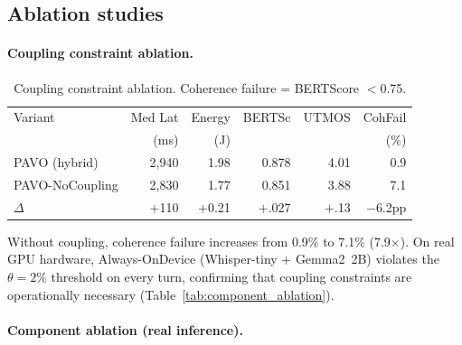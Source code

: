 \documentclass{article}
\begin{document}
\subsection{Ablation studies}

\paragraph{Coupling constraint ablation.}

\begin{table}[t]
\centering
\caption{Coupling constraint ablation. Coherence failure = BERTScore $<$0.75.}
\label{tab:ablation_coupling}
\small
\begin{tabular}{lrrrrr}
\toprule
Variant & Med Lat & Energy & BERTSc & UTMOS & CohFail \\
 & (ms) & (J) & & & (\%) \\
\midrule
PAVO (hybrid) & 2{,}940 & 1.98 & 0.878 & 4.01 & 0.9 \\
PAVO-NoCoupling & 2{,}830 & 1.77 & 0.851 & 3.88 & 7.1 \\
\midrule
$\Delta$ & $+$110 & $+$0.21 & $+$.027 & $+$.13 & $-$6.2pp \\
\bottomrule
\end{tabular}
\end{table}

Without coupling, coherence failure increases from 0.9\% to 7.1\% (7.9$\times$). On real GPU hardware, Always-OnDevice (Whisper-tiny + Gemma2~2B) violates the $\theta = 2\%$ threshold on every turn, confirming that coupling constraints are operationally necessary (Table~\ref{tab:component_ablation}).

\paragraph{Component ablation (real inference).}
\end{document}
